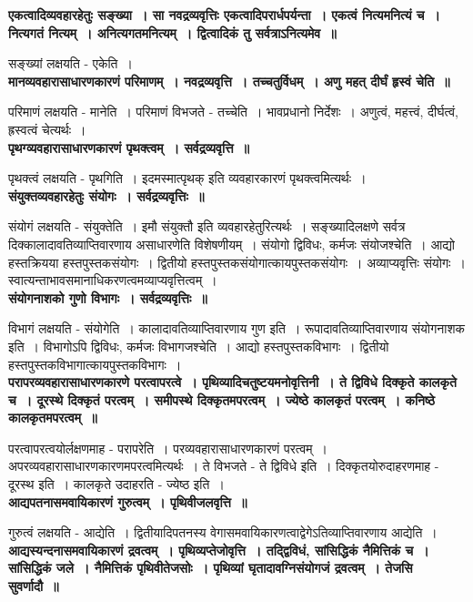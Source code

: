 {\bfseries एकत्वादिव्यवहारहेतुः सङ्ख्या~। सा नवद्रव्यवृत्तिः एकत्वादिपरार्धपर्यन्ता~। एकत्वं नित्यमनित्यं च~। नित्यगतं नित्यम्~। अनित्यगतमनित्यम्~। द्वित्वादिकं तु सर्वत्राऽनित्यमेव~॥}\par
	सङ्ख्यां लक्षयति - एकेति~।\\[10pt]
{\bfseries मानव्यवहारासाधारणकारणं परिमाणम्~। नवद्रव्यवृत्ति~। तच्चतुर्विधम्~। अणु महत् दीर्घं हृस्वं चेति~॥}\par
	परिमाणं लक्षयति - मानेति~। परिमाणं विभजते - तच्चेति~। भावप्रधानो निर्देशः~। अणुत्वं, महत्त्वं, दीर्घत्वं, ह्रस्वत्वं चेत्यर्थः~।\\[10pt]
{\bfseries पृथग्व्यवहारासाधारणकारणं पृथक्त्वम्~। सर्वद्रव्यवृत्ति~॥}\par
	पृथक्त्वं लक्षयति - पृथगिति~। इदमस्मात्पृथक् इति व्यवहारकारणं पृथक्त्वमित्यर्थः~।\\[10pt]
{\bfseries संयुक्तव्यवहारहेतुः संयोगः~। सर्वद्रव्यवृत्तिः~॥}\par
	संयोगं लक्षयति - संयुक्तेति~। इमौ संयुक्तौ इति व्यवहारहेतुरित्यर्थः~। सङ्ख्यादिलक्षणे सर्वत्र दिक्कालादावतिव्याप्तिवारणाय असाधारणेति विशेषणीयम्~। संयोगो द्विविधः, कर्मजः संयोजश्चेति~। आद्यो हस्तक्रियया हस्तपुस्तकसंयोगः~। द्वितीयो हस्तपुस्तकसंयोगात्कायपुस्तकसंयोगः~। अव्याप्यवृत्तिः संयोगः~। स्वात्यन्ताभावसमानाधिकरणत्वमव्याप्यवृत्तित्वम्~।\\[10pt]
{\bfseries संयोगनाशको गुणो विभागः~। सर्वद्रव्यवृत्तिः~॥}\par
	विभागं लक्षयति - संयोगेति~। कालादावतिव्याप्तिवारणाय गुण इति~। रूपादावतिव्याप्तिवारणाय संयोगनाशक इति~। विभागोऽपि द्विविधः, कर्मजः विभागजश्चेति~। आद्यो हस्तपुस्तकविभागः~। द्वितीयो हस्तपुस्तकविभागात्कायपुस्तकविभागः~।\\[10pt]
{\bfseries परापरव्यवहारासाधारणकारणे परत्वापरत्वे~। पृथिव्यादिचतुष्टयमनोवृत्तिनी~। ते द्विविधे दिक्कृते कालकृते च~। दूरस्थे दिक्कृतं परत्वम्~। समीपस्थे दिक्कृतमपरत्वम्~। ज्येष्ठे कालकृतं परत्वम्~। कनिष्ठे कालकृतमपरत्वम्~॥}\par
	परत्वापरत्वयोर्लक्षणमाह - परापरेति~। परव्यवहारासाधारणकारणं परत्वम्~। अपरव्यवहारासाधारणकारणमपरत्वमित्यर्थः~। ते विभजते - ते द्विविधे इति~। दिक्कृतयोरुदाहरणमाह - दूरस्थ इति~। कालकृते उदाहरति - ज्येष्ठ इति~।\\[10pt]
{\bfseries आद्यपतनासमवायिकारणं गुरुत्वम्~। पृथिवीजलवृत्ति~॥}\par
	गुरुत्वं लक्षयति - आद्येति~। द्वितीयादिपतनस्य वेगासमवायिकारणत्वाद्वेगेऽतिव्याप्तिवारणाय आद्येति~।\\[10pt]
{\bfseries आद्यस्यन्दनासमवायिकारणं द्रवत्वम्~। पृथिव्यप्तेजोवृत्ति~। तद्द्विविधं, सांसिद्धिकं नैमित्तिकं च~। सांसिद्धिकं जले~। नैमित्तिकं पृथिवीतेजसोः~। पृथिव्यां घृतादावग्निसंयोगजं द्रवत्वम्~। तेजसि सुवर्णादौ~॥}\par
